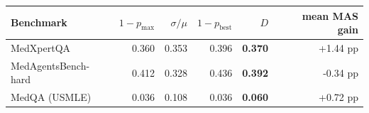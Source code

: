 \begin{tabular}{@{}lrrrrr@{}}
\toprule
Benchmark & $1-p_{\max}$ & $\sigma/\mu$ & $1-p_{\text{best}}$ & $D$ & mean MAS gain \\
\midrule
MedXpertQA & 0.360 & 0.353 & 0.396 & \textbf{0.370} & +1.44 pp \\
MedAgentsBench-hard & 0.412 & 0.328 & 0.436 & \textbf{0.392} & -0.34 pp \\
MedQA (USMLE) & 0.036 & 0.108 & 0.036 & \textbf{0.060} & +0.72 pp \\
\bottomrule
\end{tabular}
